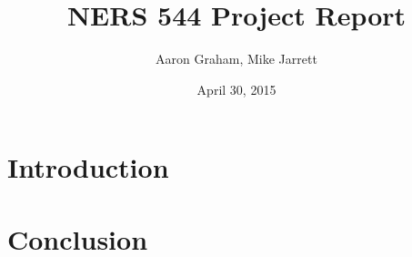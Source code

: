 \documentclass[letterpaper]{article}
\begin{document}
\begin{titlepage}
\clearpage
\title{\LARGE NERS 544 Project Report}
\author{Aaron Graham, Mike Jarrett}
\date{April 30, 2015}
\maketitle
\thispagestyle{empty}
\end{titlepage}

\pagebreak

\section{Introduction}



\section{Conclusion}

\end{document}
